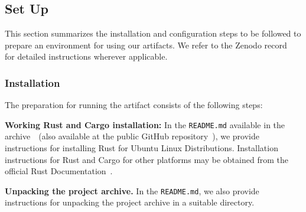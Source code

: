 \documentclass[sigconf]{acmart}
\begin{document}
	
	\subsection{Set Up}
	
	This section summarizes the installation and configuration steps to be followed to prepare an environment for using our artifacts. We refer to the Zenodo record~\cite{artifact-archive} for detailed instructions wherever applicable. 
	
	
	
	\subsubsection{Installation}\label{sec:install}
	
	The preparation for running the artifact consists of the following steps: 
	
	\begin{compactitem}
		\item \textbf{Working Rust and Cargo installation:} In the {\tt README.md} available in the archive~\cite{artifact-archive}~(also available at the public GitHub repository~\cite{github-archive}), we provide instructions for installing Rust for Ubuntu Linux Distributions. Installation instructions for Rust and Cargo for other platforms may be obtained from the official Rust Documentation~\cite{rust-doc}.
		
		\item \textbf{Unpacking the project archive.} In the {\tt README.md}, we also provide instructions for unpacking the project archive in a suitable directory.
	\end{compactitem}
	
	
\end{document}
